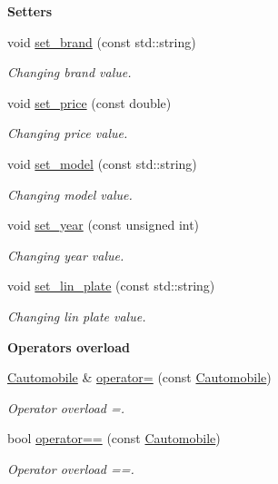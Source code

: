 \begin{Indent}{\bf Setters}\par
\begin{DoxyCompactItemize}
\item 
void \hyperlink{class_cautomobile_a73eeb7e9d796dd543aed60259d86dc59}{set\+\_\+brand} (const std\+::string)
\begin{DoxyCompactList}\small\item\em Changing brand value. \end{DoxyCompactList}\item 
void \hyperlink{class_cautomobile_a9cfc42dba3baa97c66e802a17fc935cf}{set\+\_\+price} (const double)
\begin{DoxyCompactList}\small\item\em Changing price value. \end{DoxyCompactList}\item 
void \hyperlink{class_cautomobile_aff7124d509cd01e8746ec93cdc9d6184}{set\+\_\+model} (const std\+::string)
\begin{DoxyCompactList}\small\item\em Changing model value. \end{DoxyCompactList}\item 
void \hyperlink{class_cautomobile_a2c1a1e039f2f305d839782266aba7ca5}{set\+\_\+year} (const unsigned int)
\begin{DoxyCompactList}\small\item\em Changing year value. \end{DoxyCompactList}\item 
void \hyperlink{class_cautomobile_a2b1216bf9add916b0159aefba3d748f8}{set\+\_\+lin\+\_\+plate} (const std\+::string)
\begin{DoxyCompactList}\small\item\em Changing lin plate value. \end{DoxyCompactList}\end{DoxyCompactItemize}
\end{Indent}
\begin{Indent}{\bf Operator\textquotesingle{}s overload}\par
\begin{DoxyCompactItemize}
\item 
\hyperlink{class_cautomobile}{Cautomobile} \& \hyperlink{class_cautomobile_af0c8b265ae26b2c051d1ff95097fe1f1}{operator=} (const \hyperlink{class_cautomobile}{Cautomobile})
\begin{DoxyCompactList}\small\item\em Operator overload =. \end{DoxyCompactList}\item 
bool \hyperlink{class_cautomobile_a999ac50ad714d2b67601c4c231657af8}{operator==} (const \hyperlink{class_cautomobile}{Cautomobile})
\begin{DoxyCompactList}\small\item\em Operator overload ==. \end{DoxyCompactList}\end{DoxyCompactItemize}
\end{Indent}


